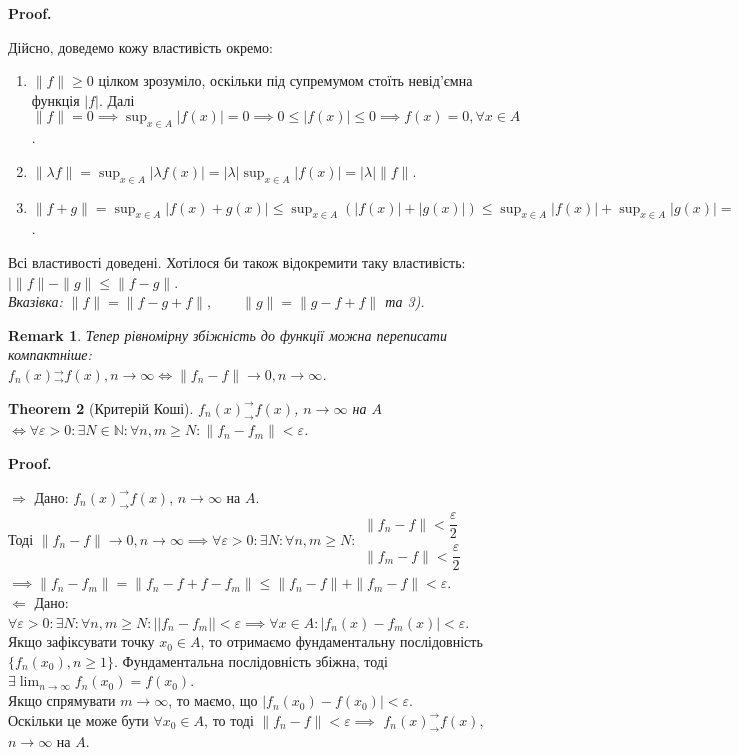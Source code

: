 \documentclass[a4paper, 10pt]{article}
\makeatletter
\def\huge{\displaystyle}
\def\qed{$\blacksquare$}
\def\rightproof{$\boxed{\Rightarrow}$ }
\def\leftproof{$\boxed{\Leftarrow}$ }
\theoremstyle{theoremdd}
\newtheorem{theorem}{Theorem}[subsection]
\theoremstyle{theoremdd}
\theoremstyle{theoremdd}
\theoremstyle{theoremdd}
\theoremstyle{theoremdd}
\theoremstyle{theoremdd}
\theoremstyle{theoremdd}
\newtheorem{remark}[theorem]{Remark}
\theoremstyle{theoremdd}
\theoremstyle{theoremdd}
\renewenvironment{proof}[1][Proof.\\]{\par
\pushQED{\hfill \qed}%
\normalfont \topsep6\p@\@plus6\p@\relax
\trivlist
\item\relax
{\bfseries
#1\@addpunct{.}}\hspace\labelsep\ignorespaces
}{%
\popQED\endtrivlist\@endpefalse
}
\newcommand{\tounif}{^\rightarrow_\rightarrow}
\makeatother
\begin{document}
\begin{proof}
Дійсно, доведемо кожу властивість окремо:
\begin{enumerate}[wide=0pt,label={\arabic*)}]
\item $\|f\| \geq 0$ цілком зрозуміло, оскільки під супремумом стоїть невід'ємна функція $|f|$. Далі\\
$\displaystyle\|f\| = 0 \implies \sup_{x \in A} |f(x)| = 0 \implies 0 \leq |f(x)| \leq 0 \implies f(x) = 0, \forall x \in A$.
\item $\| \lambda f\| = \displaystyle\sup_{x \in A} |\lambda f(x)| = |\lambda| \sup_{x \in A} |f(x)| = |\lambda| \|f\|$.
\item $\displaystyle\|f+g\| = \sup_{x \in A }|f(x)+g(x)| \leq \sup_{x \in A}(|f(x)|+|g(x)|) \leq \sup_{x \in A}|f(x)| + \sup_{x \in A}|g(x)| = \|f\| + \|g\|$.
\end{enumerate}
Всі властивості доведені. Хотілося би також відокремити таку властивість: $| \|f\| - \|g\| \leq \|f - g\|$.\\
\textit{Вказівка: $\|f\| = \|f-g+f\|, \qquad \|g\| = \|g-f+f\|$ та 3).}
\end{proof}

\begin{remark}
Тепер рівномірну збіжність до функції можна переписати компактніше:\\
$f_n(x){}\tounif f(x), n \to \infty \iff \|f_n - f\| \to 0, n \to \infty$.
\end{remark}

\begin{theorem}[Критерій Коші]
$f_n(x)^\rightarrow_\rightarrow f(x)$, $n \to \infty$ на $A$ $\iff \forall \varepsilon > 0: \exists N \in \mathbb{N}: \forall n,m \geq N: \|f_n - f_m\| < \varepsilon$.
\end{theorem}

\begin{proof}
\rightproof Дано: $f_n(x)^\rightarrow_\rightarrow f(x)$, $n \to \infty$ на $A$.\\
Тоді $\|f_n - f\| \to 0, n \to \infty \implies \forall \varepsilon > 0: \exists N: \forall n,m \geq N: \begin{gathered} \|f_n-f\| < \dfrac{\varepsilon}{2} \\ \|f_m-f\| < \dfrac{\varepsilon}{2} \end{gathered}$\\
$\implies \|f_n - f_m\| = \|f_n - f + f - f_m\| \leq \|f_n - f\| + \|f_m - f\| < \varepsilon$.
\bigskip \\
\leftproof Дано: $\forall \varepsilon > 0: \exists N: \forall n,m \geq N: ||f_n - f_m|| < \varepsilon \implies \forall x \in A: |f_n(x) - f_m(x)| < \varepsilon$.\\
Якщо зафіксувати точку $x_0 \in A$, то отримаємо фундаментальну послідовність $\{f_n(x_0), n \geq 1\}$. Фундаментальна послідовність збіжна, тоді $\exists \huge \lim_{n \to \infty} f_n(x_0) = f(x_0)$.\\
Якщо спрямувати $m \to \infty$, то маємо, що $|f_n(x_0) - f(x_0)| < \varepsilon$.\\
Оскільки це може бути $\forall x_0 \in A$, то тоді $\|f_n - f\| < \varepsilon \implies$ $f_n(x)^\rightarrow_\rightarrow f(x)$, $n \to \infty$ на $A$.
\end{proof}
\end{document}
